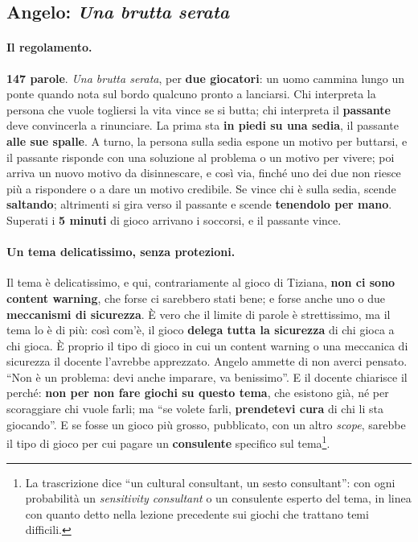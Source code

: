 \subsection{Angelo: \emph{Una brutta serata}}
\label{a6:sec:serata}

\paragraph{Il regolamento.} \textbf{147 parole}. \emph{Una brutta serata}, per
\textbf{due giocatori}: un uomo cammina lungo un ponte quando nota sul bordo qualcuno
pronto a lanciarsi. Chi interpreta la persona che vuole togliersi la vita vince se si
butta; chi interpreta il \textbf{passante} deve convincerla a rinunciare. La prima sta
\textbf{in piedi su una sedia}, il passante \textbf{alle sue spalle}. A turno, la
persona sulla sedia espone un motivo per buttarsi, e il passante risponde con una
soluzione al problema o un motivo per vivere; poi arriva un nuovo motivo da
disinnescare, e così via, finché uno dei due non riesce più a rispondere o a dare un
motivo credibile. Se vince chi è sulla sedia, scende \textbf{saltando}; altrimenti si
gira verso il passante e scende \textbf{tenendolo per mano}. Superati i \textbf{5
minuti} di gioco arrivano i soccorsi, e il passante vince.

\paragraph{Un tema delicatissimo, senza protezioni.} Il tema è delicatissimo, e
qui, contrariamente al gioco di Tiziana, \textbf{non ci sono content warning}, che
forse ci sarebbero stati bene; e forse anche uno o due \textbf{meccanismi di
sicurezza}. È vero che il limite di parole è strettissimo, ma il tema lo è di più:
così com'è, il gioco \textbf{delega tutta la sicurezza} di chi gioca a chi gioca. È
proprio il tipo di gioco in cui un content warning o una meccanica di sicurezza il
docente l'avrebbe apprezzato. Angelo ammette di non averci pensato. ``Non è un
problema: devi anche imparare, va benissimo''. E il docente chiarisce il perché:
\textbf{non per non fare giochi su questo tema}, che esistono già, né per scoraggiare
chi vuole farli; ma ``se volete farli, \textbf{prendetevi cura} di chi li sta
giocando''. E se fosse un gioco più grosso, pubblicato, con un altro \emph{scope},
sarebbe il tipo di gioco per cui pagare un \textbf{consulente} specifico sul
tema\footnote{La trascrizione dice ``un cultural consultant, un sesto consultant'':
con ogni probabilità un \emph{sensitivity consultant} o un consulente esperto del
tema, in linea con quanto detto nella lezione precedente sui giochi che trattano temi
difficili.}.

